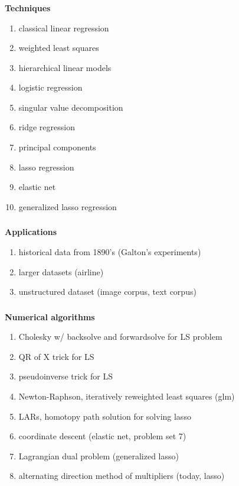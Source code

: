 \begin{frame}[fragile] \frametitle{}

\textbf{Techniques}
\begin{enumerate}
\item classical linear regression
\item weighted least squares
\item hierarchical linear models
\item logistic regression
\item singular value decomposition
\item ridge regression
\item principal components
\item lasso regression
\item elastic net
\item generalized lasso regression
\end{enumerate}

\end{frame}

\begin{frame}[fragile] \frametitle{}

\textbf{Applications}
\begin{enumerate}
\item historical data from 1890's (Galton's experiments)
\item larger datasets (airline)
\item unstructured dataset (image corpus, text corpus)
\end{enumerate}

\end{frame}

\begin{frame}[fragile] \frametitle{}

\textbf{Numerical algorithms}
\begin{enumerate}
\item Cholesky w/ backsolve and forwardsolve for LS problem
\item QR of X trick for LS
\item pseudoinverse trick for LS
\item Newton-Raphson, iteratively reweighted least squares (glm)
\item LARs, homotopy path solution for solving lasso
\item coordinate descent (elastic net, problem set 7)
\item Lagrangian dual problem (generalized lasso)
\item alternating direction method of multipliers (today, lasso)
\end{enumerate}

\end{frame}

